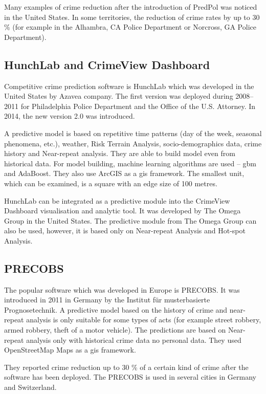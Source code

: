 \documentclass[thesis=M,english]{FITthesis}[2012/10/20]
\begin{document}
Many examples of crime reduction after the introduction of PredPol was noticed in the United States.\cite{predpol_result} In some territories, the reduction of crime rates by up to 30 \% (for example in the Alhambra, CA Police Department or Norcross, GA Police Department). 

\subsection{HunchLab and CrimeView Dashboard}

Competitive crime prediction software is HunchLab which was developed in the United States by Azavea company. The first version was deployed during 2008--2011 for Philadelphia Police Department and the Office of the U.S. Attorney. In 2014, the new version 2.0 was introduced.\cite{hunchlab} 

A predictive model is based on repetitive time patterns (day of the week, seasonal phenomena, etc.), weather, Risk Terrain Analysis, socio-de\-mo\-gra\-phics data, crime history and Near-repeat analysis. They are able to build model even from historical data. For model building, machine learning algorithms are used -- \gls{gbm} and AdaBoost. They also use ArcGIS as a \gls{gis} framework. The smallest unit, which can be examined, is a square with an edge size of 100 metres.  

HunchLab can be integrated as a predictive module into the CrimeView Dashboard visualisation and analytic tool. It was developed by The Omega Group in the United States. The predictive module from The Omega Group can also be used, however, it is based only on Near-repeat Analysis and Hot-spot Analysis.

\subsection{PRECOBS}

The popular software which was developed in Europe is PRECOBS.\cite{precobs} It was introduced in 2011 in Germany by the Institut für musterbasierte Prognosetechnik. 
A predictive model based on the history of crime and near-repeat analysis is only suitable for some types of acts (for example street robbery, armed robbery, theft of a motor vehicle). The predictions are based on Near-repeat analysis only with historical crime data no personal data. They used OpenStreetMap Maps as a \gls{gis} framework. 

They reported crime reduction up to 30 \% of a certain kind of crime after the software has been deployed.\cite{precobs_percent} The PRECOBS is used in several cities in Germany and Switzerland. 
\end{document}
